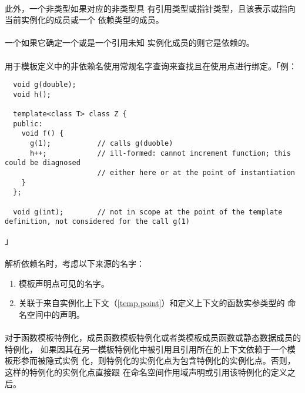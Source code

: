 \paragraph{}
此外，一个非类型如果对应的非类型具
有引用类型或指针类型，且该表示或指向当前实例化的成员或一个
依赖类型的成员。

\paragraph{}
一个如果它确定一个或是一个引用未知
实例化成员的则它是依赖的。

\paragraph{}
用于模板定义中的非依赖名使用常规名字查询来查找且在使用点进行绑定。「例：
\begin{lstlisting}
  void g(double);
  void h();

  template<class T> class Z {
  public:
    void f() {
      g(1);           // calls g(duoble)
      h++;            // ill-formed: cannot increment function; this could be diagnosed
                      // either here or at the point of instantiation
    }
  };

  void g(int);        // not in scope at the point of the template definition, not considered for the call g(1)
\end{lstlisting}」

\paragraph{}
解析依赖名时，考虑以下来源的名字：
\begin{enumerate}
  \item{模板声明点可见的名字。}
  \item{关联于来自实例化上下文（\ref{temp.point}）和定义上下文的函数实参类型的
    命名空间中的声明。}
\end{enumerate}

\paragraph{}
对于函数模板特例化，成员函数模板特例化或者类模板成员函数或静态数据成员的特例化，
如果因其在另一模板特例化中被引用且引用所在的上下文依赖于一个模板形参而被隐式实例
化，则特例化的实例化点为包含特例化的实例化点。否则，这样的特例化的实例化点直接跟
在命名空间作用域声明或引用该特例化的定义之后。

